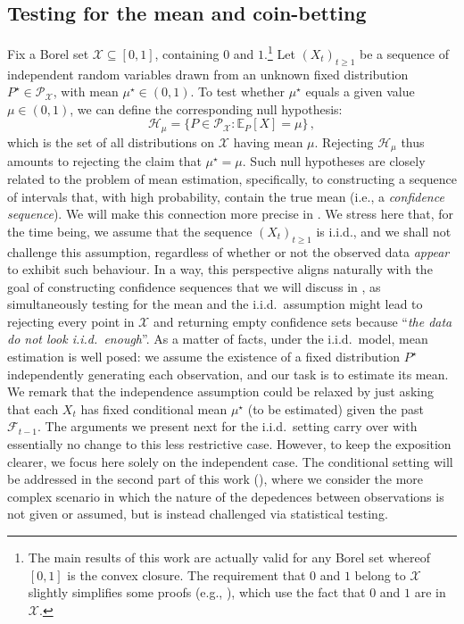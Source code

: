 \documentclass[3p, authoryear, 10pt]{elsarticle}%
\newcommand{\E}{\mathbb E}
\newcommand{\F}{\mathcal F}
\newcommand{\Hh}{\mathcal H}
\newcommand{\PR}{\mathcal P}
\newcommand{\X}{\mathcal X}
\begin{document}
\subsection{Testing for the mean and coin-betting}
Fix a Borel set $\X\subseteq[0,1]$, containing $0$ and $1$.\footnote{The main results of this work are actually valid for any Borel set whereof $[0,1]$ is the convex closure. The requirement that $0$ and $1$ belong to $\X$ slightly simplifies some proofs (e.g., ), which use the fact that $0$ and $1$ are in $\X$.}
Let $(X_t)_{t\geq 1}$ be a sequence of independent random variables drawn from an unknown fixed distribution $P^\star \in \PR_\X$, with mean $\mu^\star\in(0,1)$. To test whether $\mu^\star$ equals a given value $\mu \in (0,1)$, we can define the corresponding null hypothesis:
\begin{equation}\label{eq:Hmu}
\Hh_\mu = \{P \in \PR_{\X} : \E_P[X] = \mu\}\,,
\end{equation}
which is the set of all distributions on $\X$ having mean $\mu$. Rejecting $\Hh_\mu$ thus amounts to rejecting the claim that $\mu^\star = \mu$. Such null hypotheses are closely related to the problem of mean estimation, specifically, to constructing a sequence of intervals that, with high probability, contain the true mean (i.e., a \emph{confidence sequence}). We will make this connection more precise in . We stress here that, for the time being, we assume that the sequence $(X_t)_{t\geq 1}$ is i.i.d., and we shall not challenge this assumption, regardless of whether or not the observed data \emph{appear} to exhibit such behaviour. In a way, this perspective aligns naturally with the goal of constructing confidence sequences that we will discuss in , as simultaneously testing for the mean and the i.i.d.~assumption might lead to rejecting every point in $\X$ and returning empty confidence sets because ``\emph{the data do not look i.i.d.~enough}''. As a matter of facts, under the i.i.d.~model, mean estimation is well posed: we assume the existence of a fixed distribution $P^\star$ independently generating each observation, and our task is to estimate its mean. We remark that the independence assumption could be relaxed by just asking that each $X_t$ has fixed conditional mean $\mu^\star$ (to be estimated) given the past $\F_{t-1}$. The arguments we present next for the i.i.d.~setting carry over with essentially no change to this less restrictive case. However, to keep the exposition clearer, we focus here solely on the independent case.  The conditional setting will be addressed in the second part of this work (), where we consider the more complex scenario in which the nature of the depedences between observations is  not given or assumed, but is instead challenged via statistical testing.
\end{document}

